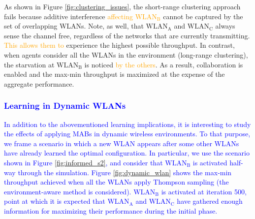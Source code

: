 \documentclass[preprint,12pt]{elsarticle}
\begin{document}
As shown in Figure \ref{fig:clustering_issues}, the short-range clustering approach fails because additive interference \textcolor{orange}{affecting $\text{WLAN}_\text{B}$} cannot be captured by the set of overlapping WLANs. Note, as well, that $\text{WLAN}_\text{A}$ and $\text{WLAN}_\text{C}$ always sense the channel free, regardless of the networks that are currently transmitting. \textcolor{orange}{This allows them to} experience the highest possible throughput. In contrast, when agents consider all the WLANs in the environment (long-range clustering), the starvation at $\text{WLAN}_\text{B}$ is noticed \textcolor{orange}{by the others}. As a result, collaboration is enabled and the max-min throughput is maximized at the expense of the aggregate performance.

\textcolor{blue}{\subsubsection{Learning in Dynamic WLANs}}

\textcolor{blue}{In addition to the abovementioned learning implications, it is interesting to study the effects of applying MABs in dynamic wireless environments. To that purpose, we frame a scenario in which a new WLAN appears after some other WLANs have already learned the optimal configuration.
In particular, we use the scenario shown in Figure \ref{fig:informed_s2}, and consider that $\text{WLAN}_\text{B}$ is activated half-way through the simulation. Figure \ref{fig:dynamic_wlan} shows the max-min throughput achieved when all the WLANs apply Thompson sampling (the environment-aware method is considered). $\text{WLAN}_\text{B}$ is activated at iteration 500, point at which it is expected that $\text{WLAN}_\text{A}$ and $\text{WLAN}_\text{C}$ have gathered enough information for maximizing their performance during the initial phase.}
\end{document}
